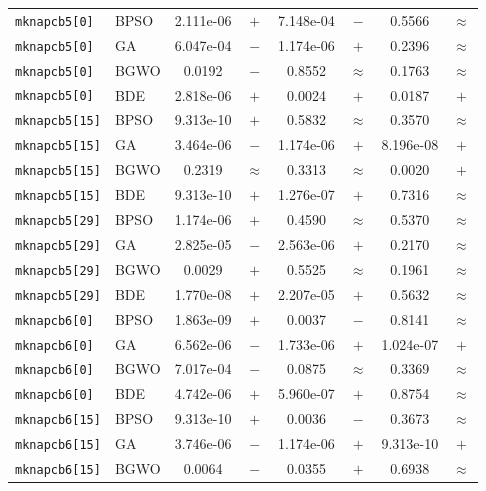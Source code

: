 \documentclass[journal,article,submit,moreauthors]{Definitions/mdpi}
\begin{document}
\begin{longtable}{llcccccc}
    \midrule
    \texttt{mknapcb5[0]} & BPSO  & 2.111e-06 & $+$ & 7.148e-04 & $-$ &    0.5566 & $\approx$ \\
    \texttt{mknapcb5[0]} & GA    & 6.047e-04 & $-$ & 1.174e-06 & $+$ &    0.2396 & $\approx$ \\
    \texttt{mknapcb5[0]} & BGWO  &    0.0192 & $-$ &    0.8552 & $\approx$ &    0.1763 & $\approx$ \\
    \texttt{mknapcb5[0]} & BDE   & 2.818e-06 & $+$ &    0.0024 & $+$ &    0.0187 & $+$ \\
    \midrule
    \texttt{mknapcb5[15]} & BPSO  & 9.313e-10 & $+$ &    0.5832 & $\approx$ &    0.3570 & $\approx$ \\
    \texttt{mknapcb5[15]} & GA    & 3.464e-06 & $-$ & 1.174e-06 & $+$ & 8.196e-08 & $+$ \\
    \texttt{mknapcb5[15]} & BGWO  &    0.2319 & $\approx$ &    0.3313 & $\approx$ &    0.0020 & $+$ \\
    \texttt{mknapcb5[15]} & BDE   & 9.313e-10 & $+$ & 1.276e-07 & $+$ &    0.7316 & $\approx$ \\
    \midrule
    \texttt{mknapcb5[29]} & BPSO  & 1.174e-06 & $+$ &    0.4590 & $\approx$ &    0.5370 & $\approx$ \\
    \texttt{mknapcb5[29]} & GA    & 2.825e-05 & $-$ & 2.563e-06 & $+$ &    0.2170 & $\approx$ \\
    \texttt{mknapcb5[29]} & BGWO  &    0.0029 & $+$ &    0.5525 & $\approx$ &    0.1961 & $\approx$ \\
    \texttt{mknapcb5[29]} & BDE   & 1.770e-08 & $+$ & 2.207e-05 & $+$ &    0.5632 & $\approx$ \\
    \midrule
    \texttt{mknapcb6[0]} & BPSO  & 1.863e-09 & $+$ &    0.0037 & $-$ &    0.8141 & $\approx$ \\
    \texttt{mknapcb6[0]} & GA    & 6.562e-06 & $-$ & 1.733e-06 & $+$ & 1.024e-07 & $+$ \\
    \texttt{mknapcb6[0]} & BGWO  & 7.017e-04 & $-$ &    0.0875 & $\approx$ &    0.3369 & $\approx$ \\
    \texttt{mknapcb6[0]} & BDE   & 4.742e-06 & $+$ & 5.960e-07 & $+$ &    0.8754 & $\approx$ \\
    \midrule
    \texttt{mknapcb6[15]} & BPSO  & 9.313e-10 & $+$ &    0.0036 & $-$ &    0.3673 & $\approx$ \\
    \texttt{mknapcb6[15]} & GA    & 3.746e-06 & $-$ & 1.174e-06 & $+$ & 9.313e-10 & $+$ \\
    \texttt{mknapcb6[15]} & BGWO  &    0.0064 & $-$ &    0.0355 & $+$ &    0.6938 & $\approx$ \\

\end{longtable}
\end{document}
